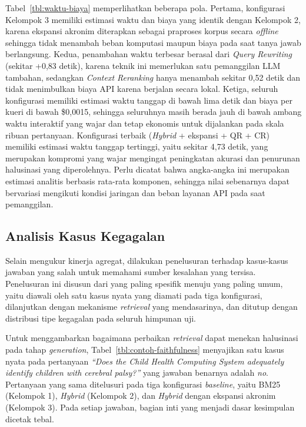Tabel~\ref{tbl:waktu-biaya} memperlihatkan beberapa pola. Pertama, konfigurasi Kelompok 3 memiliki estimasi waktu dan biaya yang identik dengan Kelompok 2, karena ekspansi akronim diterapkan sebagai praproses korpus secara \textit{offline} sehingga tidak menambah beban komputasi maupun biaya pada saat tanya jawab berlangsung. Kedua, penambahan waktu terbesar berasal dari \textit{Query Rewriting} (sekitar +0{,}83 detik), karena teknik ini memerlukan satu pemanggilan LLM tambahan, sedangkan \textit{Context Reranking} hanya menambah sekitar 0{,}52 detik dan tidak menimbulkan biaya API karena berjalan secara lokal. Ketiga, seluruh konfigurasi memiliki estimasi waktu tanggap di bawah lima detik dan biaya per kueri di bawah \$0{,}0015, sehingga seluruhnya masih berada jauh di bawah ambang waktu interaktif yang wajar dan tetap ekonomis untuk dijalankan pada skala ribuan pertanyaan. Konfigurasi terbaik (\textit{Hybrid} + ekspansi + QR + CR) memiliki estimasi waktu tanggap tertinggi, yaitu sekitar 4{,}73 detik, yang merupakan kompromi yang wajar mengingat peningkatan akurasi dan penurunan halusinasi yang diperolehnya. Perlu dicatat bahwa angka-angka ini merupakan estimasi analitis berbasis rata-rata komponen, sehingga nilai sebenarnya dapat bervariasi mengikuti kondisi jaringan dan beban layanan API pada saat pemanggilan.

\subsection{Analisis Kasus Kegagalan}
\label{subsec:analisis-kegagalan}

Selain mengukur kinerja agregat, dilakukan penelusuran terhadap kasus-kasus jawaban yang salah untuk memahami sumber kesalahan yang tersisa. Penelusuran ini disusun dari yang paling spesifik menuju yang paling umum, yaitu diawali oleh satu kasus nyata yang diamati pada tiga konfigurasi, dilanjutkan dengan mekanisme \textit{retrieval} yang mendasarinya, dan ditutup dengan distribusi tipe kegagalan pada seluruh himpunan uji.

Untuk menggambarkan bagaimana perbaikan \textit{retrieval} dapat menekan halusinasi pada tahap \textit{generation}, Tabel~\ref{tbl:contoh-faithfulness} menyajikan satu kasus nyata pada pertanyaan \textit{``Does the Child Health Computing System adequately identify children with cerebral palsy?''} yang jawaban benarnya adalah \textit{no}. Pertanyaan yang sama ditelusuri pada tiga konfigurasi \textit{baseline}, yaitu BM25 (Kelompok 1), \textit{Hybrid} (Kelompok 2), dan \textit{Hybrid} dengan ekspansi akronim (Kelompok 3). Pada setiap jawaban, bagian inti yang menjadi dasar kesimpulan dicetak tebal.

